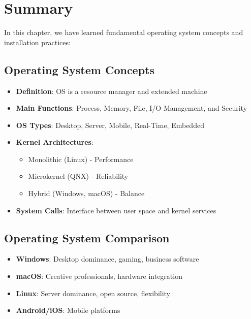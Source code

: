 \section{Summary}
\label{sec:summary}

In this chapter, we have learned fundamental operating system concepts and installation practices:

\subsection{Operating System Concepts}

\begin{itemize}
    \item \textbf{Definition}: OS is a resource manager and extended machine
    \item \textbf{Main Functions}: Process, Memory, File, I/O Management, and Security
    \item \textbf{OS Types}: Desktop, Server, Mobile, Real-Time, Embedded
    \item \textbf{Kernel Architectures}:
    \begin{itemize}
        \item Monolithic (Linux) - Performance
        \item Microkernel (QNX) - Reliability
        \item Hybrid (Windows, macOS) - Balance
    \end{itemize}
    \item \textbf{System Calls}: Interface between user space and kernel services
\end{itemize}

\subsection{Operating System Comparison}

\begin{itemize}
    \item \textbf{Windows}: Desktop dominance, gaming, business software
    \item \textbf{macOS}: Creative professionals, hardware integration
    \item \textbf{Linux}: Server dominance, open source, flexibility
    \item \textbf{Android/iOS}: Mobile platforms
\end{itemize}

